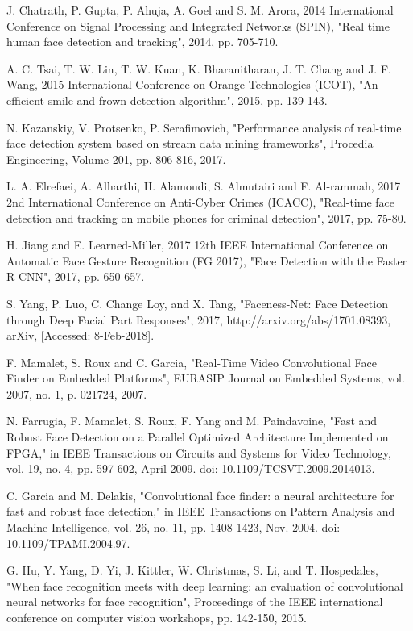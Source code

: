 \documentclass[conference]{IEEEtran}
\begin{document}
\begin{thebibliography}{00}
J. Chatrath, P. Gupta, P. Ahuja, A. Goel and S. M. Arora, 2014 International Conference on Signal Processing and Integrated Networks (SPIN), "Real time human face detection and tracking", 2014, pp. 705-710.

A. C. Tsai, T. W. Lin, T. W. Kuan, K. Bharanitharan, J. T. Chang and J. F. Wang, 2015 International Conference on Orange Technologies (ICOT), "An efficient smile and frown detection algorithm", 2015, pp. 139-143.

N. Kazanskiy, V. Protsenko, P. Serafimovich, "Performance analysis of real-time face detection system based on stream data mining frameworks", Procedia Engineering, Volume 201, pp. 806-816, 2017.

L. A. Elrefaei, A. Alharthi, H. Alamoudi, S. Almutairi and F. Al-rammah, 2017 2nd International Conference on Anti-Cyber Crimes (ICACC), "Real-time face detection and tracking on mobile phones for criminal detection", 2017, pp. 75-80.

H. Jiang and E. Learned-Miller, 2017 12th IEEE International Conference on Automatic Face Gesture Recognition (FG 2017), "Face Detection with the Faster R-CNN", 2017, pp. 650-657.

S. Yang, P. Luo, C. Change Loy, and X. Tang, "Faceness-Net: Face Detection through Deep Facial Part Responses", 2017, http://arxiv.org/abs/1701.08393, arXiv, [Accessed: 8-Feb-2018].

 F. Mamalet, S. Roux and C. Garcia, "Real-Time Video Convolutional Face Finder on Embedded Platforms", EURASIP Journal on Embedded Systems, vol. 2007, no. 1, p. 021724, 2007.

 N. Farrugia, F. Mamalet, S. Roux, F. Yang and M. Paindavoine, "Fast and Robust Face Detection on a Parallel Optimized Architecture Implemented on FPGA," in IEEE Transactions on Circuits and Systems for Video Technology, vol. 19, no. 4, pp. 597-602, April 2009.
doi: 10.1109/TCSVT.2009.2014013.

 C. Garcia and M. Delakis, "Convolutional face finder: a neural architecture for fast and robust face detection," in IEEE Transactions on Pattern Analysis and Machine Intelligence, vol. 26, no. 11, pp. 1408-1423, Nov. 2004.
doi: 10.1109/TPAMI.2004.97.

G. Hu, Y. Yang, D. Yi, J. Kittler, W. Christmas, S. Li, and T. Hospedales, "When face recognition meets with deep learning: an evaluation of convolutional neural networks for face recognition", Proceedings of the IEEE international conference on computer vision workshops, pp. 142-150, 2015.


\end{thebibliography}
\end{document}
